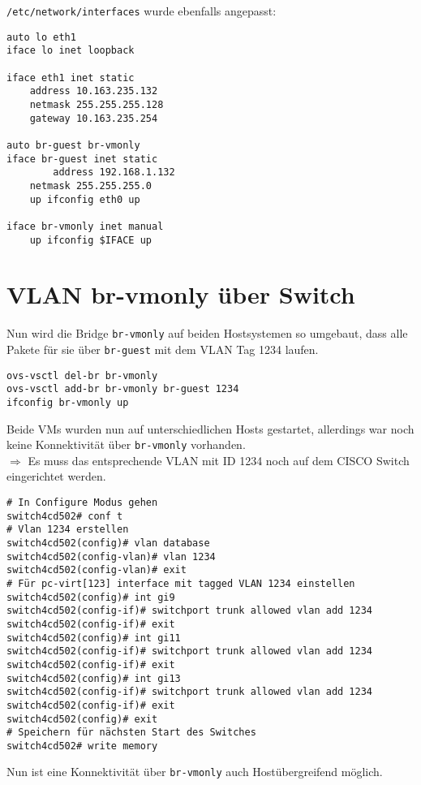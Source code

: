 \verb#/etc/network/interfaces# wurde ebenfalls angepasst:
\setupVerbatimOut
\begin{verbatim}
auto lo eth1
iface lo inet loopback

iface eth1 inet static
    address 10.163.235.132
	netmask 255.255.255.128
	gateway 10.163.235.254

auto br-guest br-vmonly
iface br-guest inet static
        address 192.168.1.132
	netmask 255.255.255.0
	up ifconfig eth0 up

iface br-vmonly inet manual 
	up ifconfig $IFACE up 
\end{verbatim}

\section{VLAN br-vmonly über Switch}
Nun wird die Bridge \verb#br-vmonly# auf beiden Hostsystemen so umgebaut, dass alle Pakete für sie über \verb#br-guest# mit dem VLAN Tag 1234 laufen.

\setupVerbatimOut
\begin{verbatim}
ovs-vsctl del-br br-vmonly
ovs-vsctl add-br br-vmonly br-guest 1234
ifconfig br-vmonly up
\end{verbatim}
Beide VMs wurden nun auf unterschiedlichen Hosts gestartet, allerdings war noch keine Kon\-nek\-tiv\-ität über \verb#br-vmonly# vorhanden.
\\
$\Rightarrow$ Es muss das entsprechende VLAN mit ID 1234 noch auf dem CISCO Switch eingerichtet werden.

\setupVerbatimOut
\begin{verbatim}
# In Configure Modus gehen
switch4cd502# conf t
# Vlan 1234 erstellen
switch4cd502(config)# vlan database 
switch4cd502(config-vlan)# vlan 1234
switch4cd502(config-vlan)# exit
# Für pc-virt[123] interface mit tagged VLAN 1234 einstellen 
switch4cd502(config)# int gi9 
switch4cd502(config-if)# switchport trunk allowed vlan add 1234
switch4cd502(config-if)# exit
switch4cd502(config)# int gi11
switch4cd502(config-if)# switchport trunk allowed vlan add 1234
switch4cd502(config-if)# exit
switch4cd502(config)# int gi13
switch4cd502(config-if)# switchport trunk allowed vlan add 1234
switch4cd502(config-if)# exit
switch4cd502(config)# exit
# Speichern für nächsten Start des Switches
switch4cd502# write memory
\end{verbatim}

Nun ist eine Konnektivität über \verb#br-vmonly# auch Hostübergreifend möglich.

